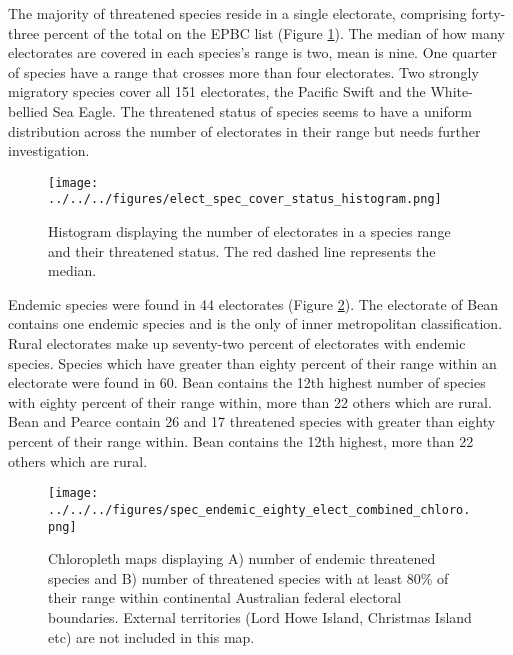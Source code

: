 \documentclass[a4paper,11pt]{article}
\begin{document}
The majority of threatened species reside in a single electorate, comprising forty-three percent of the total on the EPBC list (Figure \ref{fig:hist}). The median of how many electorates are covered in each species's range is two, mean is nine. One quarter of species have a range that crosses more than four electorates. Two strongly migratory species cover all 151 electorates, the Pacific Swift and the White-bellied Sea Eagle. The threatened status of species seems to have a uniform distribution across the number of electorates in their range but needs further investigation.

\begin{figure}[H]
	\centering
    \texttt{[image: ../../../figures/elect\_spec\_cover\_status\_histogram.png]}
    \caption{Histogram displaying the number of electorates in a species range and their threatened status. The red dashed line represents the median.}
    \label{fig:hist}
\end{figure}


Endemic species were found in 44 electorates (Figure \ref{fig:combined_chloro}). The electorate of Bean contains one endemic species and is the only of inner metropolitan classification. Rural electorates make up seventy-two percent of electorates with endemic species. Species which have greater than eighty percent of their range within an electorate were found in 60. Bean contains the 12th highest number of species with eighty percent of their range within, more than 22 others which are rural. Bean and Pearce contain 26 and 17 threatened species with greater than eighty percent of their range within. Bean contains the 12th highest, more than 22 others which are rural.

\begin{figure}[H]
	\centering
    \texttt{[image: ../../../figures/spec\_endemic\_eighty\_elect\_combined\_chloro.png]}
    \caption{Chloropleth maps displaying A) number of endemic threatened species and B) number of threatened species with at least 80\% of their range within continental Australian federal electoral boundaries. External territories (Lord Howe Island, Christmas Island etc) are not included in this map.}
    \label{fig:combined_chloro}
\end{figure}


\end{document}

